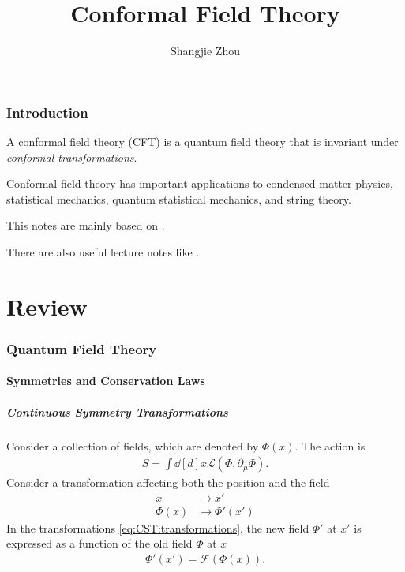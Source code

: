 \documentclass[10pt]{article}
\begin{document}
\title{Conformal Field Theory}
\author{Shangjie Zhou}

\maketitle

\section*{Introduction}
A conformal field theory (CFT) is a quantum field theory that is invariant under \textit{conformal transformations}.

Conformal field theory has important applications to condensed matter physics, statistical mechanics, quantum statistical mechanics, and string theory. 

This notes are mainly based on \cite{DiFrancesco:1997nk}.

There are also useful lecture notes like \cite{Qualls:2015qjb,Tong:2009np}.

\part{Review}
\section{Quantum Field Theory}
\subsection{Symmetries and Conservation Laws}
\subsubsection{Continuous Symmetry Transformations}
Consider a collection of fields, which are denoted by $\Phi(x)$.
The action is 
\begin{align}
    S=\int\dd[d]{x}\mathcal{L}\left(\Phi,\partial_\mu\Phi\right).
\end{align}
Consider a transformation affecting both the position and the field 
\begin{subequations}\label{eq:CST:transformations}
    \begin{align}
        x&\to x'\\
        \Phi(x)&\to\Phi'(x')
    \end{align}
\end{subequations}
In the transformations \cref{eq:CST:transformations}, the new field $\Phi'$ at $x'$ is expressed as a function of the old field $\Phi$ at $x$
\begin{align}
    \Phi'(x')=\mathcal{F}\left(\Phi(x)\right).
\end{align}
\end{document}
